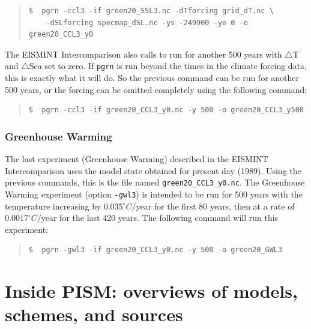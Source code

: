 \documentclass[11pt,final]{amsart}
\begin{document}
\small\begin{quote}\begin{verbatim}
$  pgrn -ccl3 -if green20_SSL3.nc -dTforcing grid_dT.nc \
	-dSLforcing specmap_dSL.nc -ys -249900 -ye 0 -o green20_CCL3_y0
\end{verbatim}
\end{quote}\normalsize

\noindent The EISMINT Intercomparison also calls to run for another 500 years with $\bigtriangleup$T and $\bigtriangleup$Sea set to zero. If \verb|pgrn| is run beyond the times in the climate forcing data, this is exactly what it will do. So the previous command can be run for another 500 years, or the forcing can be omitted completely using the following command:

\small\begin{quote}\begin{verbatim}
$  pgrn -ccl3 -if green20_CCL3_y0.nc -y 500 -o green20_CCL3_y500
\end{verbatim}
\end{quote}\normalsize

\subsubsection{Greenhouse Warming}  The last experiment (Greenhouse Warming) described in the EISMINT Intercomparison uses the model state obtained for present day (1989). Using the previous commands, this is the file named \verb|green20_CCL3_y0.nc|. The Greenhouse Warming experiment (option \verb|-gwl3|) is intended to be run for 500 years with the temperature increasing by $0.035^\circ C/$year for the first 80 years, then at a rate of $0.0017^\circ C/$year for the last 420 years. The following command will run this experiment:

\small\begin{quote}\begin{verbatim}
$  pgrn -gwl3 -if green20_CCL3_y0.nc -y 500 -o green20_GWL3
\end{verbatim}
\end{quote}\normalsize


\clearpage\newpage
\section{Inside PISM: overviews of models, schemes, and sources}\label{sect:over}
\end{document}
